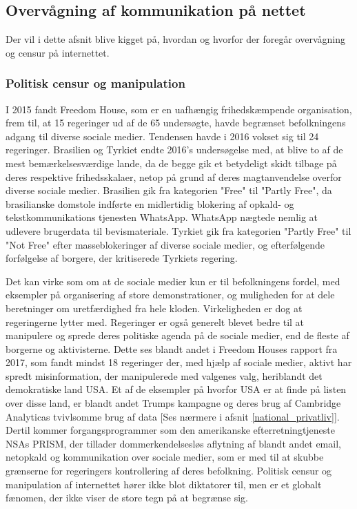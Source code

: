 \subsection{Overvågning af kommunikation på nettet}
Der vil i dette afsnit blive kigget på, hvordan og hvorfor der foregår overvågning og censur på internettet.

\subsubsection{Politisk censur og manipulation}
\label{politisk_censur}
I 2015 fandt Freedom House, som er en uafhængig frihedskæmpende organisation, frem til, at 15 regeringer ud af de 65 undersøgte, havde begrænset befolkningens adgang til diverse sociale medier.\cite{FreedomHouseRapport2016} Tendensen havde i 2016 vokset sig til 24 regeringer.\cite{FreedomHouseRapport2016} Brasilien og Tyrkiet endte 2016's undersøgelse med, at blive to af de mest bemærkelsesværdige lande, da de begge gik et betydeligt skidt tilbage på deres respektive frihedsskalaer, netop på grund af deres magtanvendelse overfor diverse sociale medier. Brasilien gik fra kategorien "Free" til "Partly Free", da brasilianske domstole indførte en midlertidig blokering af opkald- og tekstkommunikations tjenesten WhatsApp. WhatsApp nægtede nemlig at udlevere brugerdata til bevismateriale. Tyrkiet gik fra kategorien "Partly Free" til "Not Free" efter masseblokeringer af diverse sociale medier, og efterfølgende forfølgelse af borgere, der kritiserede Tyrkiets regering.\cite{FreedomHouseRapport2016}

Det kan virke som om at de sociale medier kun er til befolkningens fordel, med eksempler på organisering af store demonstrationer, og muligheden for at dele beretninger om uretfærdighed fra hele kloden. Virkeligheden er dog at regeringerne lytter med. Regeringer er også generelt blevet bedre til at manipulere og sprede deres politiske agenda på de sociale medier, end de fleste af borgerne og aktivisterne.\cite{SocialHelpDictators} Dette ses blandt andet i Freedom Houses rapport fra 2017, som fandt mindst 18 regeringer der, med hjælp af sociale medier, aktivt har spredt misinformation, der manipulerede med valgenes valg, heriblandt det demokratiske land USA.\cite{FreedomHouseRapport2017} Et af de eksempler på hvorfor USA er at finde på listen over disse land, er blandt andet Trumps kampagne og deres brug af Cambridge Analyticas tvivlsomme brug af data [Ses nærmere i afsnit \ref{national_privatliv}].\cite{Cambridge_Analytica_Zuckerberg}
Dertil kommer forgangsprogrammer som den amerikanske efterretningtjeneste NSAs PRISM, der tillader dommerkendelsesløs aflytning af blandt andet email, netopkald og kommunikation over sociale medier,\cite{PRISM} som er med til at skubbe grænserne for regeringers kontrollering af deres befolkning. Politisk censur og manipulation af internettet hører ikke blot diktatorer til, men er et globalt fænomen, der ikke viser de store tegn på at begrænse sig.\cite{FreedomHouseRapport2017}

